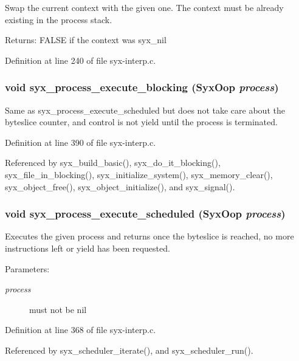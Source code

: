 Swap the current context with the given one. The context must be already existing in the process stack.

\begin{Desc}
\item[Returns:]FALSE if the context was syx\_\-nil \end{Desc}


Definition at line 240 of file syx-interp.c.\hypertarget{syx-interp_8c_34287a6590d55ee7225b0437a73609b0}{
\subsubsection{\setlength{\rightskip}{0pt plus 5cm}void syx\_\-process\_\-execute\_\-blocking ({\bf SyxOop} {\em process})}}
\label{syx-interp_8c_34287a6590d55ee7225b0437a73609b0}


Same as syx\_\-process\_\-execute\_\-scheduled but does not take care about the byteslice counter, and control is not yield until the process is terminated. 

Definition at line 390 of file syx-interp.c.

Referenced by syx\_\-build\_\-basic(), syx\_\-do\_\-it\_\-blocking(), syx\_\-file\_\-in\_\-blocking(), syx\_\-initialize\_\-system(), syx\_\-memory\_\-clear(), syx\_\-object\_\-free(), syx\_\-object\_\-initialize(), and syx\_\-signal().\hypertarget{syx-interp_8c_86764c60b013f2d11406a06ef5703735}{
\subsubsection{\setlength{\rightskip}{0pt plus 5cm}void syx\_\-process\_\-execute\_\-scheduled ({\bf SyxOop} {\em process})}}
\label{syx-interp_8c_86764c60b013f2d11406a06ef5703735}


Executes the given process and returns once the byteslice is reached, no more instructions left or yield has been requested.

\begin{Desc}
\item[Parameters:]
\begin{description}
\item[{\em process}]must not be nil \end{description}
\end{Desc}


Definition at line 368 of file syx-interp.c.

Referenced by syx\_\-scheduler\_\-iterate(), and syx\_\-scheduler\_\-run().
